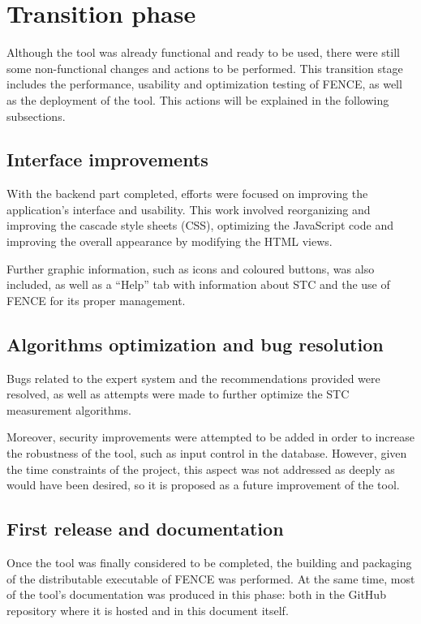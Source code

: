 \section{Transition phase}

Although the tool was already functional and ready to be used, there were still some non-functional changes and actions to be performed. This transition stage includes the performance, usability and optimization testing of FENCE, as well as the deployment of the tool. This actions will be explained in the following subsections.

\subsection{Interface improvements}

With the backend part completed, efforts were focused on improving the application's interface and usability. This work involved reorganizing and improving the cascade style sheets (CSS), optimizing the JavaScript code and improving the overall appearance by modifying the HTML views.

Further graphic information, such as icons and coloured buttons, was also included, as well as a “Help” tab with information about STC and the use of FENCE for its proper management.

\subsection{Algorithms optimization and bug resolution}

Bugs related to the expert system and the recommendations provided were resolved, as well as attempts were made to further optimize the STC measurement algorithms.

Moreover, security improvements were attempted to be added in order to increase the robustness of the tool, such as input control in the database. However, given the time constraints of the project, this aspect was not addressed as deeply as would have been desired, so it is proposed as a future improvement of the tool.

\subsection{First release and documentation}

Once the tool was finally considered to be completed, the building and packaging of the distributable executable of FENCE was performed. At the same time, most of the tool's documentation was produced in this phase: both in the GitHub repository where it is hosted and in this document itself.

